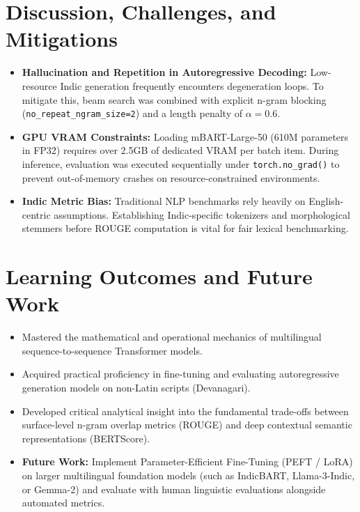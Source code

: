 \documentclass[12pt,a4paper]{report}
\begin{document}
\section{Discussion, Challenges, and Mitigations}
\begin{itemize}
    \item \textbf{Hallucination and Repetition in Autoregressive Decoding:} Low-resource Indic generation frequently encounters degeneration loops. To mitigate this, beam search was combined with explicit n-gram blocking (\lstinline|no_repeat_ngram_size=2|) and a length penalty of $\alpha = 0.6$.
    \item \textbf{GPU VRAM Constraints:} Loading mBART-Large-50 (610M parameters in FP32) requires over 2.5GB of dedicated VRAM per batch item. During inference, evaluation was executed sequentially under \lstinline|torch.no_grad()| to prevent out-of-memory crashes on resource-constrained environments.
    \item \textbf{Indic Metric Bias:} Traditional NLP benchmarks rely heavily on English-centric assumptions. Establishing Indic-specific tokenizers and morphological stemmers before ROUGE computation is vital for fair lexical benchmarking.
\end{itemize}

\section{Learning Outcomes and Future Work}
\begin{itemize}
    \item Mastered the mathematical and operational mechanics of multilingual sequence-to-sequence Transformer models.
    \item Acquired practical proficiency in fine-tuning and evaluating autoregressive generation models on non-Latin scripts (Devanagari).
    \item Developed critical analytical insight into the fundamental trade-offs between surface-level n-gram overlap metrics (ROUGE) and deep contextual semantic representations (BERTScore).
    \item \textbf{Future Work:} Implement Parameter-Efficient Fine-Tuning (PEFT / LoRA) on larger multilingual foundation models (such as IndicBART, Llama-3-Indic, or Gemma-2) and evaluate with human linguistic evaluations alongside automated metrics.
\end{itemize}
\end{document}
